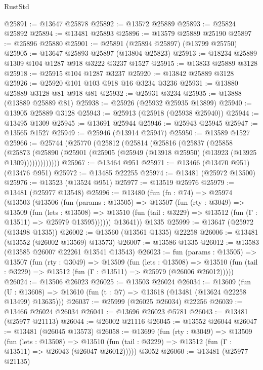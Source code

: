 \begin{lexlean}{RustStd}
\begin{coremodule}
@25891 := @13647 @25878
@25892 := @13572 @25889
@25893 := @25824 @25892
@25894 := @13481 @25893
@25896 := @13579 @25889 @25190
@25897 := @25896 @25880
@25901 := @25891 (@25894 @25897) (@13799 @25750)
@25905 := @13647 @25893 @25897 (@13804 @25823)
@25913 := @18234 @25889 @1309 @104 @1287 @918 @3222 @3237 @1527
@25915 := @13833 @25889 @3128
@25918 := @25915 @104 @1287 @3237
@25920 := @13842 @25889 @3128
@25926 := @25920 @101 @103 @918 @16 @3234 @3236
@25931 := @13880 @25889 @3128 @81 @918 @81
@25932 := @25931 @3234
@25935 := @13888 (@13889 @25889 @81)
@25938 := @25926 (@25932 @25935 @13899)
@25940 := @13905 @25889 @3128
@25943 := @25913 (@25918 (@25938 @25940))
@25944 := @13495 @1309
@25945 := @13691 @25944
@25946 := @25943 @25945
@25947 := @13565 @1527
@25949 := @25946 (@13914 @25947)
@25950 := @13589 @1527
@25966 := @25744
    (@25770
      (@25812
        (@25814
          (@25816
            (@25837
              (@25858
                (@25873
                  (@25890 (@25901 (@25905 (@25949 (@13918 @25950) (@13923 (@13925 @1309)))))))))))))
@25967 := @13464 @951
@25971 := @13466 (@13470 @951) (@13476 @951)
@25972 := @13485 @22255
@25974 := @13481 (@25972 @13500)
@25976 := @13523 (@13524 @951)
@25977 := @13519 @25976
@25979 := @13481 (@25977 @13548)
@25996 := @13480
    (fun (fn : @74) =>
    @25974
      (@13503
        (@13506
          (fun (params : @13505) =>
          @13507
            (fun (rty : @3049) =>
            @13509
              (fun (lets : @13508) =>
              @13510 (fun (tail : @3229) => @13512 (fun (Γ : @13511) => @25979 @13595))))))
        @13641))
    @1335
@25999 := @13647 (@25972 (@13498 @1335))
@26002 := @13560 (@13561 @1335) @22258
@26006 := @13481 (@13552 (@26002 @13569) @13573)
@26007 := @13586 @1335
@26012 := @13583 (@13585 @26007 @22261 @13541 @13543)
@26023 := fun (params : @13505) =>
  @13507
    (fun (rty : @3049) =>
    @13509
      (fun (lets : @13508) =>
      @13510 (fun (tail : @3229) => @13512 (fun (Γ : @13511) => @25979 (@26006 @26012)))))
@26024 := @13506 @26023
@26025 := @13503 @26024
@26034 := @13609
    (fun (U : @13608) => @13610 (fun (t : @7) => @13618 (@13481 (@13624 @22258 @13499) @13635)))
@26037 := @25999 (@26025 @26034) @22256
@26039 := @13466 @26024 @26034
@26041 := @13696 @26023 @5781
@26043 := @13481 (@25977 @21113)
@26044 := @26002 @21116
@26045 := @13552 @26044
@26047 := @13481 (@26045 @13573)
@26058 := @13699
    (fun (rty : @3049) =>
    @13509
      (fun (lets : @13508) =>
      @13510 (fun (tail : @3229) => @13512 (fun (Γ : @13511) => @26043 (@26047 @26012)))))
    @3052
@26060 := @13481 (@25977 @21135)

\end{coremodule}
\end{lexlean}
